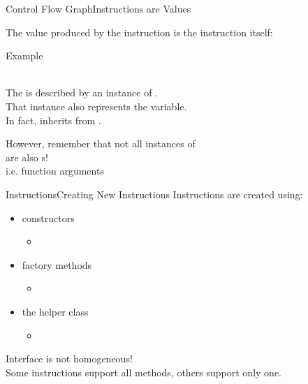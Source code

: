 \begin{frame}{Control Flow Graph}{Instructions are Values}
\vfill
\begin{center}
The value produced by the instruction is the \alert{instruction itself}:\\
\vfill
\begin{block}{Example}
\begin{center}
\\
\medskip
The  is described by an instance of . \\
That instance also represents the  variable. \\
\smallskip
In fact,  inherits from .
\end{center}
\end{block}

\vfill

However, remember that not all instances of\\
are also s!\\
\smallskip
{\small i.e. function arguments}

\end{center}
\vfill
\end{frame}


\begin{frame}{Instructions}{Creating New Instructions}
Instructions are created using:

\begin{itemize}
\item constructors
\begin{itemize}
\item {}
\end{itemize}
\item factory methods
\begin{itemize}
\item {}
\end{itemize}
\item the helper class 
\begin{itemize}
\item {}\\
\end{itemize}
\end{itemize}
\vfill
\alert{Interface is not homogeneous!}\\
Some instructions support all methods, others support only one.
\end{frame}


